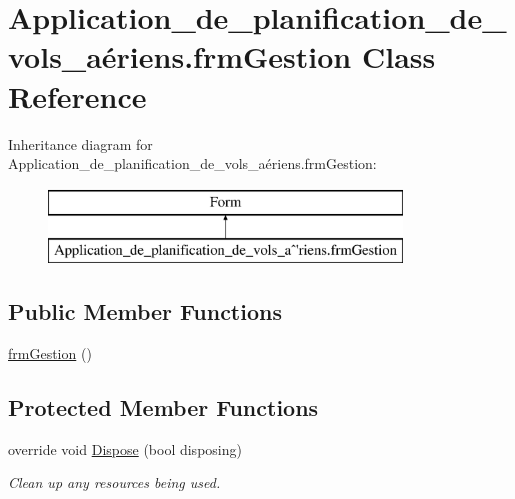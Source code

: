\hypertarget{class_application__de__planification__de__vols__a_xC3_xA9riens_1_1frm_gestion}{}\section{Application\+\_\+de\+\_\+planification\+\_\+de\+\_\+vols\+\_\+aériens.\+frm\+Gestion Class Reference}
\label{class_application__de__planification__de__vols__a_xC3_xA9riens_1_1frm_gestion}
Inheritance diagram for Application\+\_\+de\+\_\+planification\+\_\+de\+\_\+vols\+\_\+aériens.\+frm\+Gestion\+:\begin{figure}[H]
\begin{center}
\leavevmode
\includegraphics[height=2.000000cm]{class_application__de__planification__de__vols__a_xC3_xA9riens_1_1frm_gestion}
\end{center}
\end{figure}
\subsection*{Public Member Functions}
\begin{DoxyCompactItemize}
\item 
\hyperlink{class_application__de__planification__de__vols__a_xC3_xA9riens_1_1frm_gestion_aeb18ad09492b87eab030ed2f9179af97}{frm\+Gestion} ()
\end{DoxyCompactItemize}
\subsection*{Protected Member Functions}
\begin{DoxyCompactItemize}
\item 
override void \hyperlink{class_application__de__planification__de__vols__a_xC3_xA9riens_1_1frm_gestion_ae67280db69c5f87a5351f8729389d995}{Dispose} (bool disposing)
\begin{DoxyCompactList}\small\item\em Clean up any resources being used. \end{DoxyCompactList}\end{DoxyCompactItemize}


